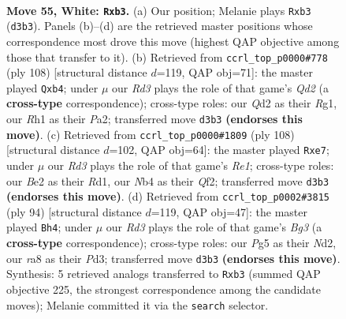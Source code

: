 \documentclass[11pt]{article}
\begin{document}
\clearpage

\begin{figure}[p]\centering
\begin{subfigure}{0.46\textwidth}\centering
\resizebox{\linewidth}{!}{%
\newchessgame
\chessboard[
  setfen={rn1qk1r1/4n1b1/6p1/3p2P1/1N1P1P1p/1p1R3P/1B1QBK2/7R w - - 2 55},
  showmover=false,
  pgfstyle=straightmove, color=movearrow, markmove={d3-b3}
]}
\caption{}
\end{subfigure}\hfill
\begin{subfigure}{0.46\textwidth}\centering
\resizebox{\linewidth}{!}{%
\newchessgame
\chessboard[
  setfen={4q3/2rn1r1k/3p1pp1/1b1P3p/1p1BP2P/p3R1P1/P2Q2BK/6R1 w - - 22 55},
  showmover=false,
  pgfstyle=straightmove, color=movearrow, markmove={d2-b4}
]}
\caption{}
\end{subfigure}
\\[4pt]
\begin{subfigure}{0.46\textwidth}\centering
\resizebox{\linewidth}{!}{%
\newchessgame
\chessboard[
  setfen={3q3k/1p1br1nr/3N1p2/2P2p2/p2P3P/P7/5Q1B/3RR1K1 w - - 2 55},
  showmover=false,
  pgfstyle=straightmove, color=movearrow, markmove={e1-e7}
]}
\caption{}
\end{subfigure}\hfill
\begin{subfigure}{0.46\textwidth}\centering
\resizebox{\linewidth}{!}{%
\newchessgame
\chessboard[
  setfen={2n3r1/p2k4/R1p1qbr1/1pP1p3/1P2P3/3P1RB1/2KN1Q2/8 w - - 3 48},
  showmover=false,
  pgfstyle=straightmove, color=movearrow, markmove={g3-h4}
]}
\caption{}
\end{subfigure}
\caption{\textbf{Move 55, White: \texttt{Rxb3}.} (a) Our position; Melanie plays \texttt{Rxb3} (\texttt{d3b3}). Panels (b)--(d) are the retrieved master positions whose correspondence most drove this move (highest QAP objective among those that transfer to it). (b) Retrieved from \texttt{ccrl\_top\_p0000\#778} (ply 108) [structural distance $d$=119, QAP obj=71]: the master played \texttt{Qxb4}; under $\mu$ our \emph{Rd3} plays the role of that game's \emph{Qd2} (a \textbf{cross-type} correspondence); cross-type roles: our \emph{Q}d2 as their \emph{R}g1, our \emph{R}h1 as their \emph{P}a2; transferred move \texttt{d3b3} \textbf{(endorses this move)}. (c) Retrieved from \texttt{ccrl\_top\_p0000\#1809} (ply 108) [structural distance $d$=102, QAP obj=64]: the master played \texttt{Rxe7}; under $\mu$ our \emph{Rd3} plays the role of that game's \emph{Re1}; cross-type roles: our \emph{B}e2 as their \emph{R}d1, our \emph{N}b4 as their \emph{Q}f2; transferred move \texttt{d3b3} \textbf{(endorses this move)}. (d) Retrieved from \texttt{ccrl\_top\_p0002\#3815} (ply 94) [structural distance $d$=119, QAP obj=47]: the master played \texttt{Bh4}; under $\mu$ our \emph{Rd3} plays the role of that game's \emph{Bg3} (a \textbf{cross-type} correspondence); cross-type roles: our \emph{P}g5 as their \emph{N}d2, our \emph{r}a8 as their \emph{P}d3; transferred move \texttt{d3b3} \textbf{(endorses this move)}. Synthesis: 5 retrieved analogs transferred to \texttt{Rxb3} (summed QAP objective 225, the strongest correspondence among the candidate moves); Melanie committed it via the \texttt{search} selector.}
\label{fig:thought-m108}
\end{figure}
\end{document}

